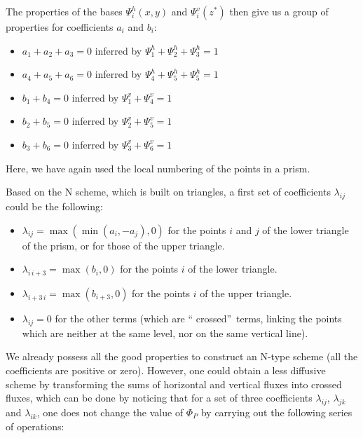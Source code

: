 The properties of the bases $\Psi_{i}^{h}(x,y)$ and $\Psi_{i}^{v}(z^{\ast})$
then give us a group of properties for coefficients $a_{i}$ and $b_{i}$:

\begin{itemize}
\item $a_{1}+a_{2}+a_{3}=0$ inferred by $\Psi_{1}^{h}+\Psi_{2}^{h}+\Psi
_{3}^{h}=1$

\item $a_{4}+a_{5}+a_{6}=0$ inferred by $\Psi_{4}^{h}+\Psi_{5}^{h}+\Psi
_{5}^{h}=1$

\item $b_{1}+b_{4}=0$ inferred by $\Psi_{1}^{v}+\Psi_{4}^{v}=1$

\item $b_{2}+b_{5}=0$ inferred by $\Psi_{2}^{v}+\Psi_{5}^{v}=1$

\item $b_{3}+b_{6}=0$ inferred by $\Psi_{3}^{v}+\Psi_{6}^{v}=1$
\end{itemize}

Here, we have again used the local numbering of the points in a prism.

Based on the N scheme, which is built on triangles, a first set of
coefficients $\lambda_{ij}$ could be the following:

\begin{itemize}
\item $\lambda_{ij}=\max(\min(a_{i},-a_{j}),0)$ for the points $i$ and $j$ of
the lower triangle of the prism, or for those of the upper triangle.

\item $\lambda_{i\,i+3}=\max(b_{i},0)$ for the points $i$ of the lower triangle.

\item $\lambda_{i+3\,i}=\max(b_{i+3},0)$ for the points $i$ of the upper triangle.

\item $\lambda_{ij}=0$ for the other terms (which are \textquotedblleft
crossed\textquotedblright\ terms, linking the points which are neither at the
same level, nor on the same vertical line).
\end{itemize}

We already possess all the good properties to construct an N-type scheme (all
the coefficients are positive or zero). However, one could obtain a less
diffusive scheme by transforming the sums of horizontal and vertical fluxes
into crossed fluxes, which can be done by noticing that for a set of three
coefficients $\lambda_{ij}$, $\lambda_{jk}$ and $\lambda_{ik}$, one does not
change the value of $\Phi_{P}$ by carrying out the following series of operations:

